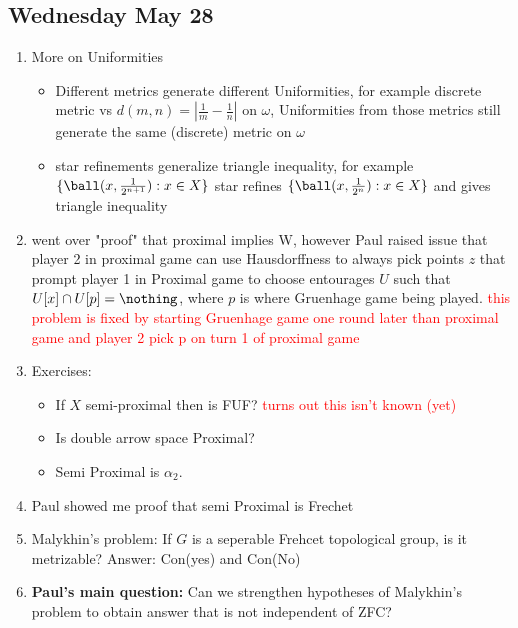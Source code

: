 \documentclass{article}
\begin{document}
\subsection*{Wednesday May 28}
\begin{enumerate}
    \item More on Uniformities 
    \begin{itemize}
        \item Different metrics generate different Uniformities, for example discrete metric vs \(d(m, n) = |\frac{1}{m} - \frac{1}{n}|\) on \(\omega\), Uniformities from those metrics still generate the same (discrete) metric on \(\omega\)
        \item star refinements generalize triangle inequality, for example \(\{\ball(x, \frac{1}{2^{n + 1}}): x \in X\}\) star refines \(\{\ball(x, \frac{1}{2^n}): x \in X\}\) and gives triangle inequality
    \end{itemize}
    \item went over "proof" that proximal implies W, however Paul raised issue that player 2 in proximal game can use Hausdorffness to always pick points \(z\) that prompt player 1 in Proximal game to choose entourages \(U\) such that \(U[x] \cap U[p] = \nothing\), where \(p\) is where Gruenhage game being played. \textcolor{red}{this problem is fixed by starting Gruenhage game one round later than proximal game and player 2 pick p on turn 1 of proximal game}
    \item Exercises:
    \begin{itemize}
        \item If \(X\) semi-proximal then is FUF?  \textcolor{red}{turns out this isn't known (yet)}
        \item Is double arrow space Proximal?\checkmark
        \item Semi Proximal is \(\alpha_2\). \checkmark
    \end{itemize}
    \item Paul showed me proof that semi Proximal is Frechet
    \item Malykhin's problem: If \(G\) is a seperable Frehcet topological group, is it metrizable? Answer: Con(yes) and Con(No)
    \item \textbf{Paul's main question:} Can we strengthen hypotheses of Malykhin's problem to obtain answer that is not independent of ZFC?
\end{enumerate}
\end{document}
